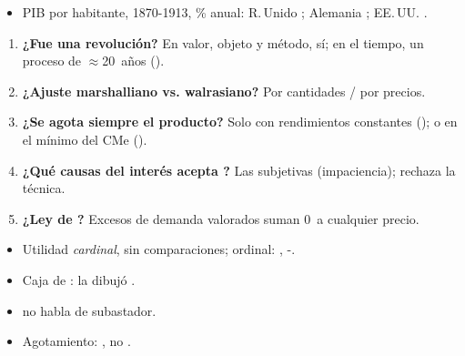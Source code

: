 \documentclass{article}
\begin{document}
\begin{columnas}
\anexorepaso
{}
\begin{itemize}
\item PIB por habitante, 1870-1913, \% anual: R.\,Unido ; Alemania ; EE.\,UU. .
\end{itemize}
\begin{enumerate}
\item \textbf{¿Fue una revolución?} En valor, objeto y método, sí; en el tiempo, un proceso de $\approx$20~años ().
\item \textbf{¿Ajuste marshalliano vs. walrasiano?} Por cantidades / por precios.
\item \textbf{¿Se agota siempre el producto?} Solo con rendimientos constantes (); o en el mínimo del CMe ().
\item \textbf{¿Qué causas del interés acepta ?} Las subjetivas (impaciencia); rechaza la técnica.
\item \textbf{¿Ley de ?} Excesos de demanda valorados suman 0~a cualquier precio.
\end{enumerate}
\begin{trampa}
\begin{itemize}
\item Utilidad \emph{cardinal}, sin comparaciones; ordinal: , -.
\item Caja de : la dibujó .
\item {} no habla de subastador.
\item Agotamiento: , no .
\end{itemize}
\end{trampa}

\end{columnas}
\end{document}
